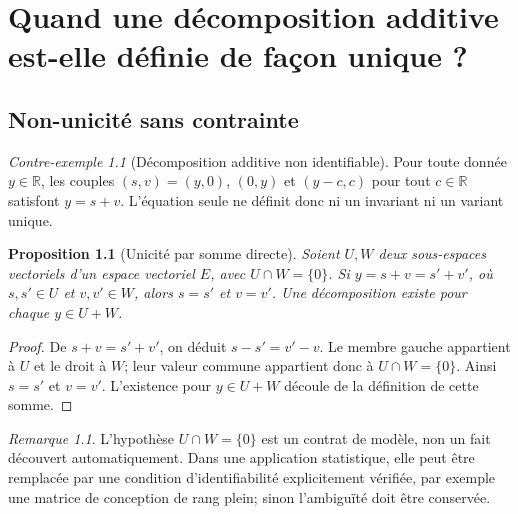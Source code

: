 \documentclass[11pt,oneside]{book}
\newtheorem{proposition}[theoreme]{Proposition}
\theoremstyle{definition}
\theoremstyle{remark}
\newtheorem{remarque}[theoreme]{Remarque}
\newtheorem{contreexemple}[theoreme]{Contre-exemple}
\newcommand{\R}{\mathbb R}
\newcommand{\1}{\mathbf 1}
\begin{document}
\chapter{Quand une décomposition additive est-elle définie de façon unique ?}
\section{Non-unicité sans contrainte}
\begin{contreexemple}[Décomposition additive non identifiable]
Pour toute donnée \(y\in\R\), les couples \((s,v)=(y,0)\), \((0,y)\) et \((y-c,c)\) pour tout \(c\in\R\) satisfont \(y=s+v\). L'équation seule ne définit donc ni un invariant ni un variant unique.
\end{contreexemple}
\begin{proposition}[Unicité par somme directe]
Soient \(U,W\) deux sous-espaces vectoriels d'un espace vectoriel \(E\), avec \(U\cap W=\{0\}\). Si \(y=s+v=s'+v'\), où \(s,s'\in U\) et \(v,v'\in W\), alors \(s=s'\) et \(v=v'\). Une décomposition existe pour chaque \(y\in U+W\).
\end{proposition}
\begin{proof}
De \(s+v=s'+v'\), on déduit \(s-s'=v'-v\). Le membre gauche appartient à \(U\) et le droit à \(W\); leur valeur commune appartient donc à \(U\cap W=\{0\}\). Ainsi \(s=s'\) et \(v=v'\). L'existence pour \(y\in U+W\) découle de la définition de cette somme.\end{proof}
\begin{remarque}
L'hypothèse \(U\cap W=\{0\}\) est un contrat de modèle, non un fait découvert automatiquement. Dans une application statistique, elle peut être remplacée par une condition d'identifiabilité explicitement vérifiée, par exemple une matrice de conception de rang plein; sinon l'ambiguïté doit être conservée.
\end{remarque}
\end{document}

